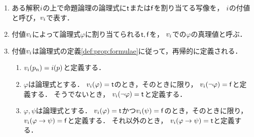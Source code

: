 \begin{myDefinition}[命題論理の付値]
  \label{def:prop:valuation}
  \begin{enumerate}
    \item ある解釈$i$の上で命題論理の論理式に$\mathsf{t}$または$\mathsf{f}$を割り当てる写像を，
          $i$の付値と呼び，$v_i$で表す．
    \item 付値$v_i$によって論理式$\varphi$に割り当てられる$\mathsf{t},\mathsf{f}$を，
          $v_i$での$\varphi$の真理値と呼ぶ．
    \item 付値$v_i$は論理式の定義\ref*{def:prop:formulae}に従って，再帰的に定義される．
          \begin{enumerate}
            \item $v_i(p_n) = i(p)$と定義する．
            \item $\varphi$は論理式とする．
                  $v_i(\varphi) = \mathsf{t}$のとき，そのときに限り，
                  $v_i(\neg \varphi) = \mathsf{f}$と定義する．
                  そうでないとき，
                  $v_i(\neg \varphi) = \mathsf{t}$と定義する．
            \item $\varphi,\psi$は論理式とする．
                  $v_i(\varphi) = \mathsf{t}$かつ$v_i(\psi) = \mathsf{f}$のとき，そのときに限り，
                  $v_i(\varphi \to \psi) = \mathsf{f}$と定義する．
                  それ以外のとき，
                  $v_i(\varphi \to \psi) = \mathsf{t}$と定義する．
          \end{enumerate}
  \end{enumerate}
\end{myDefinition}

